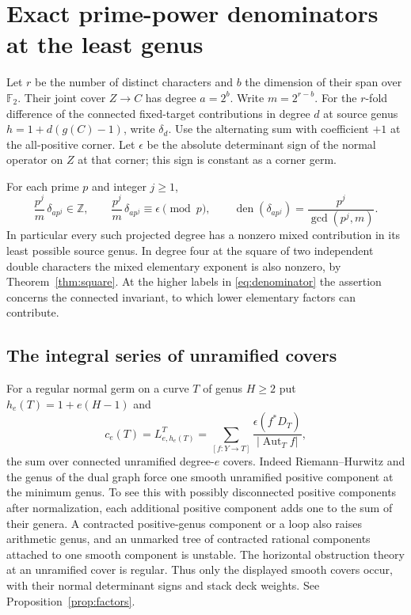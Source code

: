 \section{Exact prime-power denominators at the least genus}\label{sec:prime}
Let \(r\) be the number of distinct characters and \(b\) the dimension of their span over \(\mathbb F_2\). Their joint cover \(Z\to C\) has degree \(a=2^b\). Write \(m=2^{r-b}\). For the \(r\)-fold difference of the connected fixed-target contributions in degree \(d\) at source genus \(h=1+d(g(C)-1)\), write \(\delta_d\). Use the alternating sum with coefficient \(+1\) at the all-positive corner. Let \(\epsilon\) be the absolute determinant sign of the normal operator on \(Z\) at that corner; this sign is constant as a corner germ.

\begin{theorem}\label{thm:prime} For each prime $p$ and integer $j\ge1$,
\begin{equation}
\frac{p^j}{m}\,\delta_{a p^j}\in\mathbb Z,
 \qquad \frac{p^j}{m}\,\delta_{a p^j}\equiv\epsilon\pmod p,
 \qquad
 \operatorname{den}(\delta_{a p^j})=\frac{p^j}{\gcd(p^j,m)} .           \label{eq:denominator}
\end{equation}
In particular every such projected degree has a nonzero mixed contribution in its least possible source genus. In degree four at the square of two independent double characters the mixed elementary exponent is also nonzero, by Theorem~\ref{thm:square}. At the higher labels in \eqref{eq:denominator} the assertion concerns the connected invariant, to which lower elementary factors can contribute.

\end{theorem}

\subsection{The integral series of unramified covers}

For a regular normal germ on a curve \(T\) of genus \(H\ge2\) put \(h_e(T)=1+e(H-1)\) and
\[c_e(T)=L^T_{e,h_e(T)}
       =\sum_{[f:Y\to T]}\frac{\epsilon(f^*D_T)}{|\operatorname{Aut}_T f|},\]
the sum over connected unramified degree-\(e\) covers. Indeed Riemann--Hurwitz and the genus of the dual graph force one smooth unramified positive component at the minimum genus. To see this with possibly disconnected positive components after normalization, each additional positive component adds one to the sum of their genera. A contracted positive-genus component or a loop also raises arithmetic genus, and an unmarked tree of contracted rational components attached to one smooth component is unstable. The horizontal obstruction theory at an unramified cover is regular. Thus only the displayed smooth covers occur, with their normal determinant signs and stack deck weights. See Proposition~\ref{prop:factors}.

